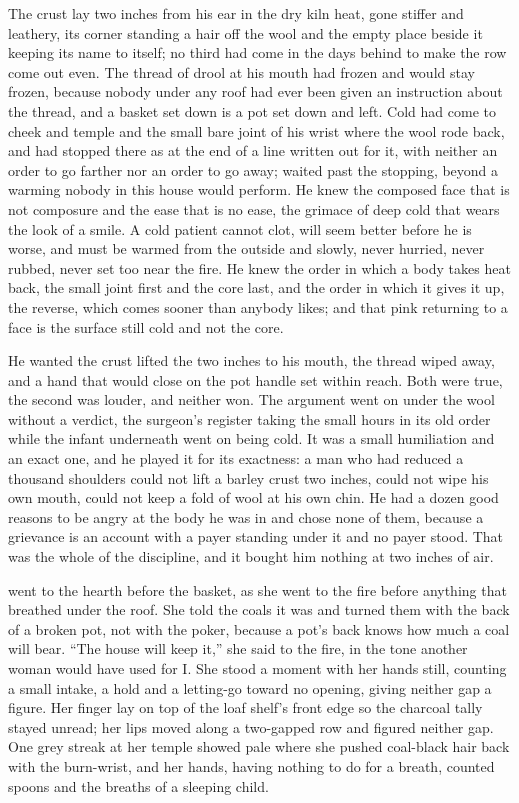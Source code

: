 The crust lay two inches from his ear in the dry kiln heat, gone stiffer and leathery, its corner standing a hair off the wool and the empty place beside it keeping its name to itself; no third had come in the days behind to make the row come out even. The thread of drool at his mouth had frozen and would stay frozen, because nobody under any roof had ever been given an instruction about the thread, and a basket set down is a pot set down and left. Cold had come to cheek and temple and the small bare joint of his wrist where the wool rode back, and had stopped there as at the end of a line written out for it, with neither an order to go farther nor an order to go away;  waited past the stopping, beyond a warming nobody in this house would perform. He knew the composed face that is not composure and the ease that is no ease, the grimace of deep cold that wears the look of a smile. A cold patient cannot clot, will seem better before he is worse, and must be warmed from the outside and slowly, never hurried, never rubbed, never set too near the fire. He knew the order in which a body takes heat back, the small joint first and the core last, and the order in which it gives it up, the reverse, which comes sooner than anybody likes; and that pink returning to a face is the surface still cold and not the core.

He wanted the crust lifted the two inches to his mouth, the thread wiped away, and a hand that would close on the pot handle set within reach. Both were true, the second was louder, and neither won. The argument went on under the wool without a verdict, the surgeon's register taking the small hours in its old order while the infant underneath went on being cold. It was a small humiliation and an exact one, and he played it for its exactness: a man who had reduced a thousand shoulders could not lift a barley crust two inches, could not wipe his own mouth, could not keep a fold of wool at his own chin. He had a dozen good reasons to be angry at the body he was in and chose none of them, because a grievance is an account with a payer standing under it and no payer stood. That was the whole of the discipline, and it bought him nothing at two inches of air.

\scenebreak

 went to the hearth before the basket, as she went to the fire before anything that breathed under the roof. She told the coals it was  and turned them with the back of a broken pot, not with the poker, because a pot's back knows how much a coal will bear. “The house will keep it,” she said to the fire, in the tone another woman would have used for I. She stood a moment with her hands still, counting a small intake, a hold and a letting-go toward no opening, giving neither gap a figure. Her finger lay on top of the loaf shelf's front edge so the charcoal tally stayed unread; her lips moved along a two-gapped row and figured neither gap. One grey streak at her temple showed pale where she pushed coal-black hair back with the burn-wrist, and her hands, having nothing to do for a breath, counted spoons and the breaths of a sleeping child.

